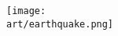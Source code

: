 \begin{multicols*}{2}
\vspace*{\fill}

\begin{center}
  \texttt{[image: \\art/earthquake.png]}
\end{center}

\vspace*{\fill}

\end{multicols*}
